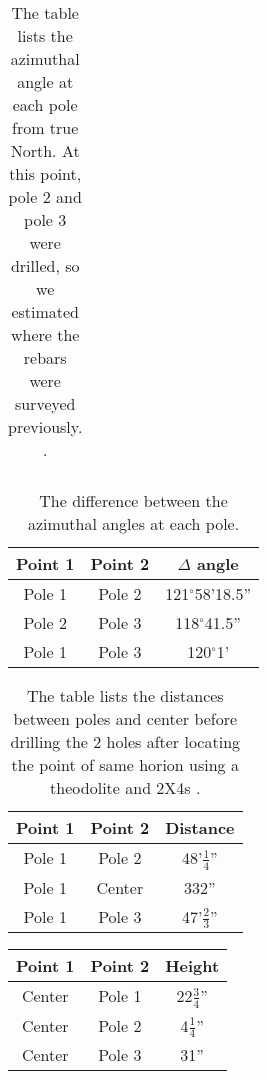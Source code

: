 \documentclass[12pt, letter]{article}
\begin{document}
\begin{enumerate}
\begin{table}[!h]
\begin{tabular}{|c|c|}
\end{tabular}
\caption{The table lists the azimuthal angle at each pole from true North. At this point, pole 2 and pole 3 were drilled, so we estimated where the rebars were surveyed previously.  \label{Tab:az_at_poles}.}
\end{table}



\begin{table}[!h]
\centering
\begin{tabular}{|c|c|c|} \hline

Point 1 & Point 2 & $\Delta$ angle \\ \hline
Pole 1 & Pole 2 & 121$^\circ$58'18.5'' \\ \hline
Pole 2 & Pole 3 & 118$^\circ$41.5'' \\ \hline
Pole 1 & Pole 3 &  120$^\circ$1'\\ \hline

\end{tabular}
\caption{The difference between the azimuthal angles at each pole. \label{Tab:diff_az_poles}}
\end{table}



\begin{table}[!h]
\centering
\begin{tabular}{|c|c|c|} \hline

Point 1 & Point 2 & Distance \\ \hline
Pole 1 & Pole 2 & 48'$\frac{1}{4}$'' \\ \hline
Pole 1 & Center & 332'' \\ \hline
Pole 1 & Pole 3 & 47'$\frac{2}{3}$'' \\ \hline

\end{tabular}
\caption{The table lists the distances between poles and center before drilling the 2 holes after locating the point of same horion using a theodolite and 2X4s \label{Tab:survey_dist_b4_2holes}.}
\end{table}


\begin{table}[!h]
\centering
\begin{tabular}{|c|c|c|} \hline

Point 1 & Point 2 & Height \\ \hline
Center & Pole 1 & 22$\frac{3}{4}$'' \\ \hline
Center & Pole 2 & 4$\frac{1}{4}$'' \\ \hline
Center & Pole 3 & 31'' \\ \hline



\end{tabular}
\end{table}
\end{enumerate}
\end{document}
